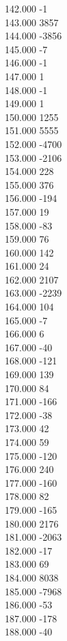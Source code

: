 { 142.000	-1 \\
 143.000	3857 \\
 144.000	-3856 \\
 145.000	-7 \\
 146.000	-1 \\
 147.000	1 \\
 148.000	-1 \\
 149.000	1 \\
 150.000	1255 \\
 151.000	5555 \\
 152.000	-4700 \\
 153.000	-2106 \\
 154.000	228 \\
 155.000	376 \\
 156.000	-194 \\
 157.000	19 \\
 158.000	-83 \\
 159.000	76 \\
 160.000	142 \\
 161.000	24 \\
 162.000	2107 \\
 163.000	-2239 \\
 164.000	104 \\
 165.000	-7 \\
 166.000	6 \\
 167.000	-40 \\
 168.000	-121 \\
 169.000	139 \\
 170.000	84 \\
 171.000	-166 \\
 172.000	-38 \\
 173.000	42 \\
 174.000	59 \\
 175.000	-120 \\
 176.000	240 \\
 177.000	-160 \\
 178.000	82 \\
 179.000	-165 \\
 180.000	2176 \\
 181.000	-2063 \\
 182.000	-17 \\
 183.000	69 \\
 184.000	8038 \\
 185.000	-7968 \\
 186.000	-53 \\
 187.000	-178 \\
 188.000	-40 \\
}
